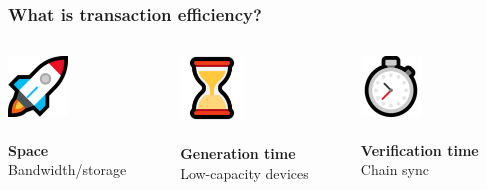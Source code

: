\documentclass[aspectratio=169]{beamer}
\begin{document}
\begin{frame}
\frametitle{What is transaction efficiency?}
\begin{columns}

\begin{column}{0.3\textwidth}
\centering
\includegraphics[width=0.4\textwidth]{icon-space.png} \\~\\
\textbf{Space} \\
Bandwidth/storage
\end{column}

\begin{column}{0.3\textwidth}
\centering
\includegraphics[width=0.4\textwidth]{icon-hourglass.png} \\~\\
\textbf{Generation time} \\
Low-capacity devices
\end{column}

\begin{column}{0.3\textwidth}
\centering
\includegraphics[width=0.4\textwidth]{icon-stopwatch.png} \\~\\
\textbf{Verification time} \\
Chain sync
\end{column}

\end{columns}
\end{frame}
\end{document}
